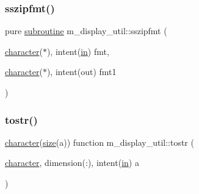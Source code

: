 \subsubsection{\texorpdfstring{sszipfmt()}{sszipfmt()}}
{\footnotesize\ttfamily pure \hyperlink{M__stopwatch_83_8txt_acfbcff50169d691ff02d4a123ed70482}{subroutine} m\+\_\+display\+\_\+util\+::sszipfmt (\begin{DoxyParamCaption}\item[{\hyperlink{option__stopwatch_83_8txt_abd4b21fbbd175834027b5224bfe97e66}{character}($\ast$), intent(\hyperlink{M__journal_83_8txt_afce72651d1eed785a2132bee863b2f38}{in})}]{fmt,  }\item[{\hyperlink{option__stopwatch_83_8txt_abd4b21fbbd175834027b5224bfe97e66}{character}($\ast$), intent(out)}]{fmt1 }\end{DoxyParamCaption})\hspace{0.3cm}{\ttfamily [private]}}

\mbox{\label{namespacem__display__util_ae2d4ae17104c7a91b0a3e4962e3af54a}} 
\subsubsection{\texorpdfstring{tostr()}{tostr()}}
{\footnotesize\ttfamily \hyperlink{option__stopwatch_83_8txt_abd4b21fbbd175834027b5224bfe97e66}{character}(\hyperlink{what__overview_81_8txt_ab5692ed87074f1d5ec850a9ffa8b5af9}{size}(a)) function m\+\_\+display\+\_\+util\+::tostr (\begin{DoxyParamCaption}\item[{\hyperlink{option__stopwatch_83_8txt_abd4b21fbbd175834027b5224bfe97e66}{character}, dimension(\+:), intent(\hyperlink{M__journal_83_8txt_afce72651d1eed785a2132bee863b2f38}{in})}]{a }\end{DoxyParamCaption})\hspace{0.3cm}{\ttfamily [private]}}

\mbox{\label{namespacem__display__util_a76361afb9f9c3952c258f1f8053ec62a}} 

